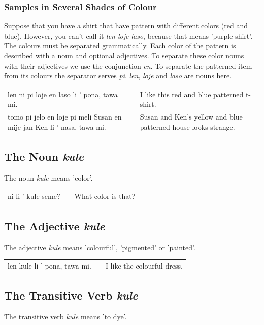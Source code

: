 \subsubsection*{Samples in Several Shades of Colour}
Suppose that you have a shirt that have pattern with different colors (red and blue).
However, you can't call it \textit{len loje laso}, because that means 'purple shirt'.
The colours must be separated grammatically.
Each color of the pattern is described with a noun and optional adjectives.
To separate these color nouns with their adjectives we use the conjunction \textit{en}.
To separate the patterned item from its colours the separator serves \textit{pi}.
\textit{len}, \textit{loje} and \textit{laso} are nouns here.

\begin{supertabular}{p{5,5cm}|ll}
    len ni pi loje en laso li ' pona, tawa mi.                             &  & I like this red and blue patterned t-shirt.                    \\
    tomo pi jelo en loje pi meli Susan en mije jan Ken li ' nasa, tawa mi. &  & Susan and Ken's yellow and blue patterned house looks strange. \\
\end{supertabular}

\subsection*{The Noun \textit{kule}}
The noun \textit{kule} means 'color'.

\begin{supertabular}{p{5,5cm}|ll}
    ni li ' kule seme? &  & What color is that? \\
\end{supertabular}

\subsection*{The Adjective \textit{kule}}
The adjective \textit{kule} means 'colourful', 'pigmented' or 'painted'.

\begin{supertabular}{p{5,5cm}|ll}
    len kule li ' pona, tawa mi. &  & I like the colourful dress. \\
\end{supertabular}

\subsection*{The Transitive Verb \textit{kule}}
The transitive verb \textit{kule} means 'to dye'.

